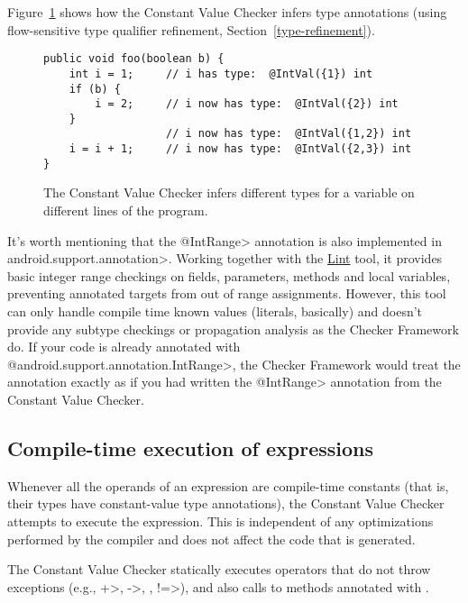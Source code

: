 Figure~\ref{fig-value-multivalue} shows how the Constant Value Checker
infers type annotations (using flow-sensitive type qualifier refinement, Section~\ref{type-refinement}).

\begin{figure}
\begin{Verbatim}
public void foo(boolean b) {
    int i = 1;     // i has type:  @IntVal({1}) int
    if (b) {
        i = 2;     // i now has type:  @IntVal({2}) int
    }
                   // i now has type:  @IntVal({1,2}) int
    i = i + 1;     // i now has type:  @IntVal({2,3}) int
}
\end{Verbatim}
\caption{The Constant Value Checker infers different types
  for a variable on different lines of the program.}
\label{fig-value-multivalue}
\end{figure}

It's worth mentioning that the \<@IntRange> annotation is also implemented in
\<android.support.annotation>. Working together with the
\href{https://developer.android.com/studio/write/lint.html}{Lint} tool, it
provides basic integer range checkings on fields, parameters, methods and
local variables, preventing annotated targets from out of range assignments.
However, this tool can only handle compile time known values (literals,
basically) and doesn't provide any subtype checkings or propagation analysis
as the Checker Framework do. If your code is already annotated with
\<@android.support.annotation.IntRange>, the Checker Framework would treat
the annotation exactly as if you had written the \<@IntRange> annotation
from the Constant Value Checker.


\subsection{Compile-time execution of expressions\label{staticallyexecutable-annotation}}

Whenever all the operands of an expression are compile-time constants (that
is, their types have constant-value type annotations), the Constant Value
Checker attempts to execute the expression.  This is independent of any
optimizations performed by the compiler and does not affect the code that
is generated.

The Constant Value Checker statically executes operators that do
not throw exceptions (e.g., \<+>, \<->, \code{<\relax<}, \<!=>), and also
calls to methods annotated with
.


